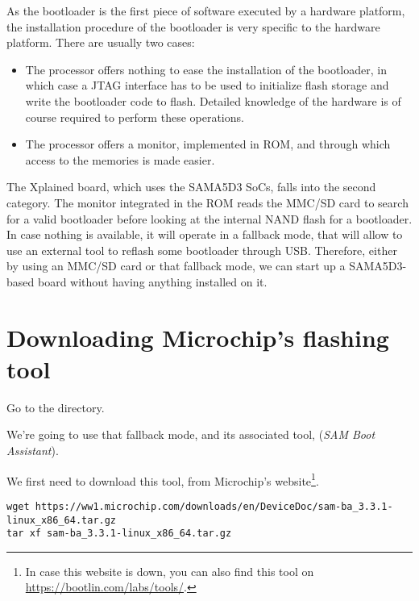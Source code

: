 
As the bootloader is the first piece of software executed by a
hardware platform, the installation procedure of the bootloader is
very specific to the hardware platform. There are usually two cases:

\begin{itemize}

\item The processor offers nothing to ease the installation of the
  bootloader, in which case a JTAG interface has to be used to initialize
  flash storage and write the bootloader code to flash. Detailed
  knowledge of the hardware is of course required to perform these
  operations.

\item The processor offers a monitor, implemented in ROM, and through
  which access to the memories is made easier.

\end{itemize}

The Xplained board, which uses the SAMA5D3 SoCs, falls into the second
category. The monitor integrated in the ROM reads the MMC/SD card to
search for a valid bootloader before looking at the internal NAND
flash for a bootloader. In case nothing is available, it will operate
in a fallback mode, that will allow to use an external tool
to reflash some bootloader through USB. Therefore, either by using an MMC/SD
card or that fallback mode, we can start up a SAMA5D3-based board
without having anything installed on it.

\section{Downloading Microchip's flashing tool}

Go to the  directory.

We're going to use that fallback mode, and its associated tool,
 ({\em SAM Boot Assistant}).

We first need to download this tool, from Microchip's website\footnote{
In case this website is down, you can also find this
tool on \url{https://bootlin.com/labs/tools/}.}.

\begin{verbatim}
wget https://ww1.microchip.com/downloads/en/DeviceDoc/sam-ba_3.3.1-linux_x86_64.tar.gz
tar xf sam-ba_3.3.1-linux_x86_64.tar.gz
\end{verbatim}

